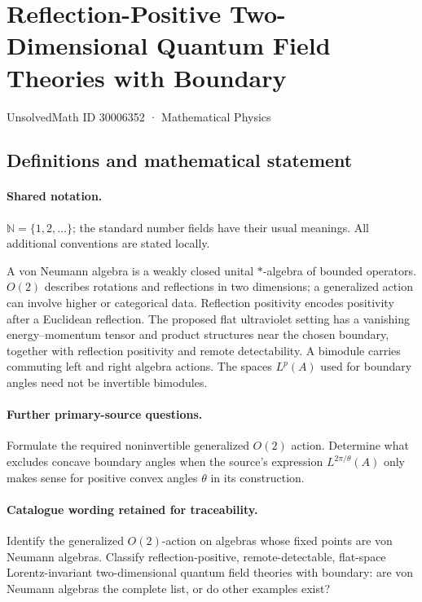 \documentclass[11pt]{article}
\begin{document}
\setcounter{section}{30006351}
\section{Reflection-Positive Two-Dimensional Quantum Field Theories with Boundary}\label{30006352}
{\small UnsolvedMath ID 30006352 · Mathematical Physics}
\subsection{Definitions and mathematical statement}

\paragraph{Shared notation.}$\mathbb N=\{1,2,\ldots\}$; the standard number fields have their usual meanings. All additional conventions are stated locally.


A von Neumann algebra is a weakly closed unital $*$-algebra of bounded operators. $O(2)$ describes rotations and reflections in two dimensions; a generalized action can involve higher or categorical data. Reflection positivity encodes positivity after a Euclidean reflection. The proposed flat ultraviolet setting has a vanishing energy--momentum tensor and product structures near the chosen boundary, together with reflection positivity and remote detectability. A bimodule carries commuting left and right algebra actions. The spaces $L^p(A)$ used for boundary angles need not be invertible bimodules.

\paragraph{Further primary-source questions.}Formulate the required noninvertible generalized $O(2)$ action. Determine what excludes concave boundary angles when the source's expression $L^{2\pi/\theta}(A)$ only makes sense for positive convex angles $\theta$ in its construction.

\paragraph{Catalogue wording retained for traceability.}
Identify the generalized $O(2)$-action on algebras whose fixed points are von Neumann algebras. Classify reflection-positive, remote-detectable, flat-space Lorentz-invariant two-dimensional quantum field theories with boundary: are von Neumann algebras the complete list, or do other examples exist?
\end{document}
